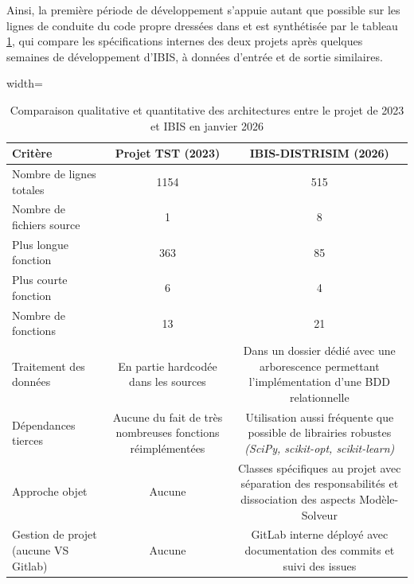         Ainsi, la première période de développement s'appuie autant que possible sur les lignes de conduite du code propre dressées dans \cite{clean_code} et est synthétisée par le tableau \ref{tab:comparaisonarchi}, qui compare
        les spécifications internes des deux projets après quelques semaines de développement d'IBIS, à données d'entrée et de sortie similaires.

        \begin{table}[h!]
            \centering
            \caption{Comparaison qualitative et quantitative des architectures entre le projet de 2023 et IBIS en janvier 2026}\label{tab:comparaisonarchi}
            \begin{adjustbox}{width=\textwidth}
                \begin{tabular}{lcc}
                    \toprule
                    \textbf{Critère} & \textbf{Projet TST (2023)} & \textbf{IBIS-DISTRISIM (2026)} \\
                    \midrule
                    Nombre de lignes totales & 1154 & 515 \\
                    Nombre de fichiers source & 1 & 8\\
                    Plus longue fonction & 363 & 85 \\
                    Plus courte fonction & 6 & 4 \\
                    Nombre de fonctions & 13 & 21 \\
                    Traitement des données & En partie hardcodée dans les sources & Dans un dossier dédié avec une arborescence permettant l'implémentation d'une BDD relationnelle \\
                    Dépendances tierces & Aucune du fait de très nombreuses fonctions réimplémentées & Utilisation aussi fréquente que possible de librairies robustes \textit{(SciPy, scikit-opt, scikit-learn)} \\
                    Approche objet & Aucune & Classes spécifiques au projet avec séparation des responsabilités et dissociation des aspects Modèle-Solveur \\
                    Gestion de projet (aucune VS Gitlab) & Aucune & GitLab interne déployé avec documentation des commits et suivi des issues \\
                    \bottomrule
                \end{tabular}
            \end{adjustbox}
        \end{table}

